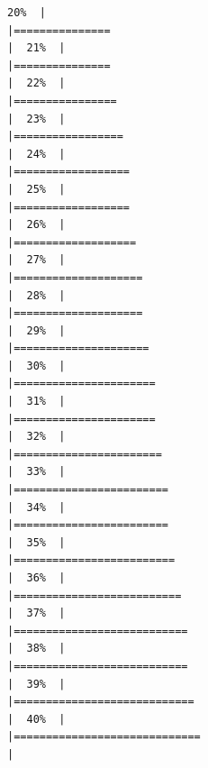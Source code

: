 \documentclass[
]{article}
\begin{document}
\begin{verbatim}
20%  |                                                                              |===============                                                       |  21%  |                                                                              |===============                                                       |  22%  |                                                                              |================                                                      |  23%  |                                                                              |=================                                                     |  24%  |                                                                              |==================                                                    |  25%  |                                                                              |==================                                                    |  26%  |                                                                              |===================                                                   |  27%  |                                                                              |====================                                                  |  28%  |                                                                              |====================                                                  |  29%  |                                                                              |=====================                                                 |  30%  |                                                                              |======================                                                |  31%  |                                                                              |======================                                                |  32%  |                                                                              |=======================                                               |  33%  |                                                                              |========================                                              |  34%  |                                                                              |========================                                              |  35%  |                                                                              |=========================                                             |  36%  |                                                                              |==========================                                            |  37%  |                                                                              |===========================                                           |  38%  |                                                                              |===========================                                           |  39%  |                                                                              |============================                                          |  40%  |                                                                              |=============================                                         |  
\end{verbatim}
\end{document}
